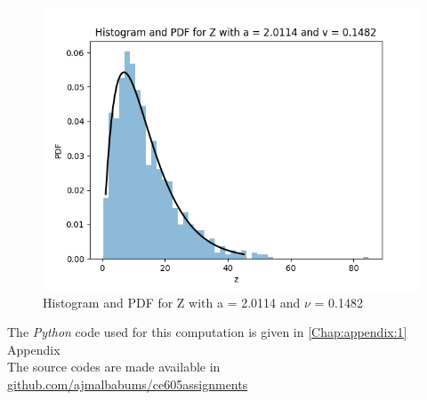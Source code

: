 \begin{figure}[H]
	\centering
	\includegraphics[width=0.9\linewidth]{Figures/Chapter1/Figure_3}
	\caption{Histogram and PDF for Z with a = 2.0114 and $\nu$ = 0.1482}
	\label{fig:figure3}
\end{figure}

The \textit{Python} code used for this computation is given in \ref{Chap:appendix:1}{ Appendix} \\
The source codes are made available in \href{https://github.com/ajmalbabums/ce605assignments.git}{github.com/ajmalbabums/ce605assignments}